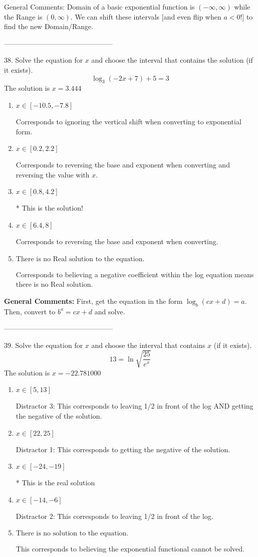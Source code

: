 \documentclass{article}[10pt]
\begin{document}
General Comments: Domain of a basic exponential function is $(-\infty, \infty)$ while the Range is $(0, \infty)$. We can shift these intervals [and even flip when $a<0$!] to find the new Domain/Range.

-----------------------------------------------

38. Solve the equation for $x$ and choose the interval that contains the solution (if it exists).
$$ \log_{3}{(-2x+7)}+5 = 3 $$ 
The solution is $ x = 3.444 $ 

\begin{enumerate}[label=\Alph*.] 
\item $ x \in [-10.5, -7.8] $ 

  Corresponds to ignoring the vertical shift when converting to exponential form. 
\item $ x \in [0.2, 2.2] $ 

  Corresponds to reversing the base and exponent when converting and reversing the value with $x$. 
\item $ x \in [0.8, 4.2] $ 

 * This is the solution! 
\item $ x \in [6.4, 8] $ 

  Corresponds to reversing the base and exponent when converting. 
\item $ \text{There is no Real solution to the equation.} $ 

  Corresponds to believing a negative coefficient within the log equation means there is no Real solution. 
\end{enumerate} 
 
\textbf{General Comments:} First, get the equation in the form $\log_b{(cx+d)} = a$. Then, convert to $b^a = cx+d$ and solve.

-----------------------------------------------

39.  Solve the equation for $x$ and choose the interval that contains $x$ (if it exists).
$$  13 = \ln{\sqrt{\frac{25}{e^x}}} $$ 
The solution is $ x = -22.781000 $ 

\begin{enumerate}[label=\Alph*.] 
\item $ x \in [5,13] $ 

  Distractor 3: This corresponds to leaving 1/2 in front of the log AND getting the negative of the solution. 
\item $ x \in [22,25] $ 

  Distractor 1: This corresponds to getting the negative of the solution. 
\item $ x \in [-24,-19] $ 

 * This is the real solution 
\item $ x \in [-14,-6] $ 

  Distractor 2: This corresponds to leaving 1/2 in front of the log. 
\item $ \text{There is no solution to the equation.} $ 

 This corresponds to believing the exponential functional cannot be solved. 
\end{enumerate} 
 
\end{document}
